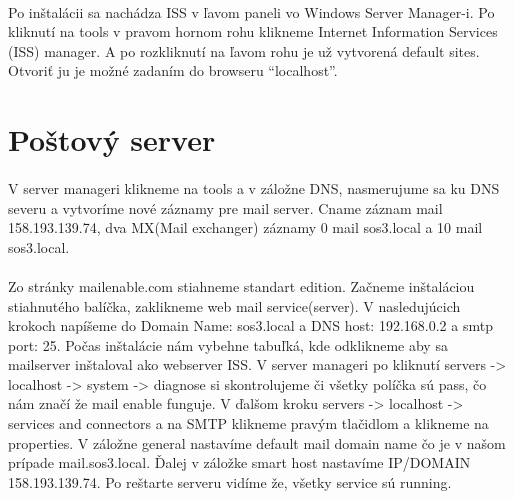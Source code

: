 \paragraph{}
Po inštalácii sa nachádza ISS v ľavom paneli vo Windows Server Manager-i. Po kliknutí na tools v pravom hornom rohu klikneme Internet Information Services (ISS) manager. A po rozkliknutí na ľavom rohu je už vytvorená default sites. Otvoriť ju je možné zadaním do browseru “localhost”.

\section{Poštový server}
\paragraph{}
V server manageri klikneme na tools a v záložne DNS, nasmerujume sa ku DNS severu a vytvoríme nové záznamy pre mail server. Cname záznam mail 158.193.139.74, dva MX(Mail exchanger) záznamy 0 mail sos3.local a 10 mail sos3.local.
\paragraph{}
Zo stránky mailenable.com stiahneme standart edition. Začneme inštaláciou stiahnutého balíčka, zaklikneme web mail service(server). V nasledujúcich krokoch napíšeme do Domain Name: sos3.local a DNS host: 192.168.0.2 a smtp port: 25. Počas inštalácie nám vybehne tabuľká, kde odklikneme aby sa mailserver inštaloval ako webserver ISS. V server manageri po kliknutí servers -> localhost -> system -> diagnose si skontrolujeme či všetky políčka sú pass, čo nám značí že mail enable funguje. V ďalšom kroku servers -> localhost -> services and connectors  a na SMTP klikneme pravým tlačidlom a klikneme na properties. V záložne general nastavíme default mail domain name čo je v našom prípade mail.sos3.local. Ďalej v záložke smart host nastavíme IP/DOMAIN 158.193.139.74. Po reštarte serveru vidíme že, všetky service sú running.
